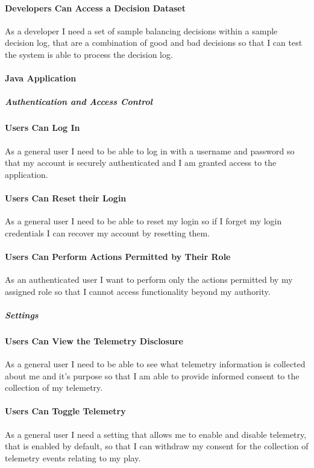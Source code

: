 \paragraph{Developers Can Access a Decision Dataset}
As a developer I need a set of sample balancing decisions within a sample decision log, that are a combination of good and bad decisions so that I can test the system is able to process the decision log.

\paragraph{Java Application}

\subparagraph{Authentication and Access Control}

\paragraph{Users Can Log In}
As a general user I need to be able to log in with a username and password so that my account is securely authenticated and I am granted access to the application.

\paragraph{Users Can Reset their Login}
As a general user I need to be able to reset my login so if I forget my login credentials I can recover my account by resetting them.

\paragraph{Users Can Perform Actions Permitted by Their Role}
As an authenticated user I want to perform only the actions permitted by my assigned role so that I cannot access functionality beyond my authority.

\subparagraph{Settings}

\paragraph{Users Can View the Telemetry Disclosure}
As a general user I need to be able to see what telemetry information is collected about me and it's purpose so that I am able to provide informed consent to the collection of my telemetry.

\paragraph{Users Can Toggle Telemetry}
As a general user I need a setting that allows me to enable and disable telemetry, that is enabled by default, so that I can withdraw my consent for the collection of telemetry events relating to my play.

